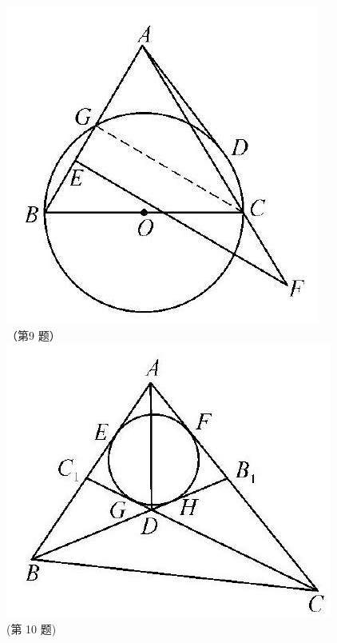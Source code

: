 \documentclass[10pt]{article}
\begin{document}
\begin{enumerate}
\includegraphics[max width=\textwidth, center]{2024_10_30_66b8e5e701da2093c133g-095(1)}\\
（第9 题）\\
\includegraphics[max width=\textwidth, center]{2024_10_30_66b8e5e701da2093c133g-095}\\
(第 10 题)\\

\end{enumerate}
\end{document}
